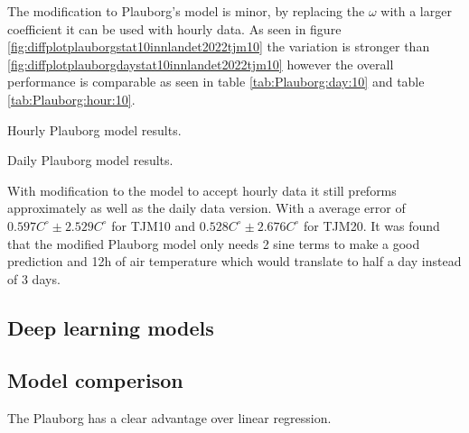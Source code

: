 The modification to Plauborg's model is minor, by replacing the $\omega$ with a larger coefficient it can be used with hourly data. As seen in figure \ref{fig:diffplotplauborgstat10innlandet2022tjm10} the variation is stronger than \ref{fig:diffplotplauborgdaystat10innlandet2022tjm10} however the overall performance is comparable as seen in table \ref{tab:Plauborg:day:10} and table \ref{tab:Plauborg:hour:10}. 

\begin{table}
	\centering
	\resizebox{\textwidth}{!}{
		
	}
	\caption{Hourly Plauborg model results.}
	\label{tab:plauborg_hour_res}
\end{table}

\begin{table}
	\centering
	\resizebox{\textwidth}{!}{
		
	}
	\caption{Daily Plauborg model results.}
	\label{tab:plauborg_day_res}
\end{table}

With modification to the model to accept hourly data it still preforms approximately as well as the daily data version. With a average error of $0.597C^\circ \pm 2.529C^\circ$ for TJM10 and $0.528C^\circ \pm 2.676C^\circ$ for TJM20. It was found that the modified Plauborg model only needs 2 sine terms to make a good prediction and 12h of air temperature which would translate to half a day instead of 3 days.

\subsection{Deep learning models}



\subsection{Model comperison}

The Plauborg has a clear advantage over linear regression.
